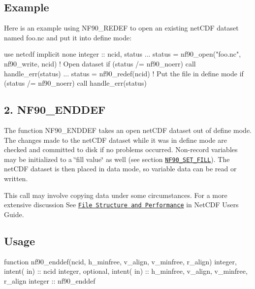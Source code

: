 \subsection*{Example}

Here is an example using N\+F90\+\_\+\+R\+E\+D\+EF to open an existing net\+C\+DF dataset named foo.\+nc and put it into define mode\+:


\begin{DoxyCode}
\textcolor{keywordtype}{use }netcdf
\textcolor{keywordtype}{implicit none}
\textcolor{keywordtype}{integer} :: ncid, status
...
status = nf90\_open(\textcolor{stringliteral}{"foo.nc"}, nf90\_write, ncid) \textcolor{comment}{! Open dataset}
\textcolor{keywordflow}{if} (status /= nf90\_noerr) \textcolor{keyword}{call }handle\_err(status)
...
status = nf90\_redef(ncid)                       \textcolor{comment}{! Put the file in define mode}
\textcolor{keywordflow}{if} (status /= nf90\_noerr) \textcolor{keyword}{call }handle\_err(status)
\end{DoxyCode}
\hypertarget{f90_datasets_f90-nf90_enddef}{}\subsection{2. N\+F90\+\_\+\+E\+N\+D\+D\+E\+F }\label{f90_datasets_f90-nf90_enddef}
The function N\+F90\+\_\+\+E\+N\+D\+D\+EF takes an open net\+C\+DF dataset out of define mode. The changes made to the net\+C\+DF dataset while it was in define mode are checked and committed to disk if no problems occurred. Non-\/record variables may be initialized to a \char`\"{}fill value\char`\"{} as well (see section \href{#NF90_005fSET_005fFILL}{\tt N\+F90\+\_\+\+S\+E\+T\+\_\+\+F\+I\+LL}). The net\+C\+DF dataset is then placed in data mode, so variable data can be read or written.

This call may involve copying data under some circumstances. For a more extensive discussion See \href{netcdf.html#File-Structure-and-Performance}{\tt File Structure and Performance} in Net\+C\+DF Users Guide.

\subsection*{Usage}


\begin{DoxyCode}
\textcolor{keyword}{function }nf90\_enddef(ncid, h\_minfree, v\_align, v\_minfree, r\_align)
  \textcolor{keywordtype}{integer},           \textcolor{keywordtype}{intent( in)} :: ncid
  \textcolor{keywordtype}{integer}, \textcolor{keywordtype}{optional}, \textcolor{keywordtype}{intent( in)} :: h\_minfree, v\_align, v\_minfree, r\_align
  \textcolor{keywordtype}{integer}                        :: nf90\_enddef
\end{DoxyCode}


